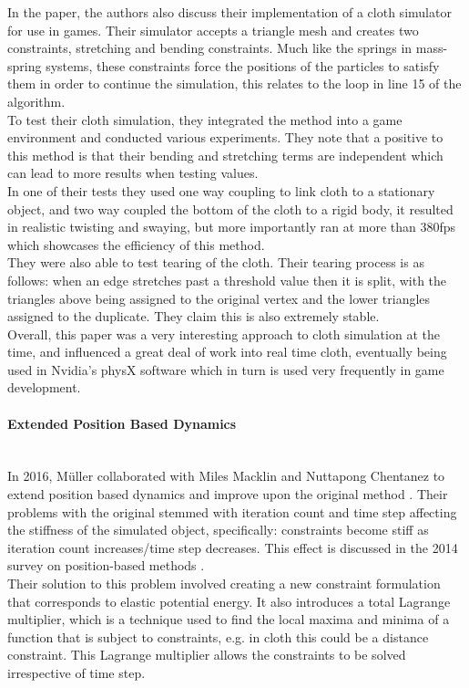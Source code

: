 \documentclass[12pt,a4paper]{article}
\begin{document}
In the paper, the authors also discuss their implementation of a cloth simulator for use in games. Their simulator accepts a triangle mesh and creates two constraints, stretching and bending constraints. Much like the springs in mass-spring systems, these constraints force the positions of the particles to satisfy them in order to continue the simulation, this relates to the loop in line 15 of the algorithm.
\\
To test their cloth simulation, they integrated the method into a game environment and conducted various experiments. They note that a positive to this method is that their bending and stretching terms are independent which can lead to more results when testing values. \\ 
In one of their tests they used one way coupling to link cloth to a stationary object, and two way coupled the bottom of the cloth to a rigid body, it resulted in realistic twisting and swaying, but more importantly ran at more than 380fps which showcases the efficiency of this method. \\
They were also able to test tearing of the cloth. Their tearing process is as follows: when an edge stretches past a threshold value then it is split, with the triangles above being assigned to the original vertex and the lower triangles assigned to the duplicate. They claim this is also extremely stable.\\

Overall, this paper was a very interesting approach to cloth simulation at the time, and influenced a great deal of work into real time cloth, eventually being used in Nvidia's physX software which in turn is used very frequently in game development.

\paragraph{Extended Position Based Dynamics} \mbox{} \\
In 2016, Müller collaborated with Miles Macklin and Nuttapong Chentanez to extend position based dynamics and improve upon the original method \cite{macklin2016xpbd}. Their problems with the original stemmed with iteration count and time step affecting the stiffness of the simulated object, specifically: constraints become stiff as iteration count increases/time step decreases. This effect is discussed in the 2014 survey on position-based methods \cite{bender2014survey}. \\
Their solution to this problem involved creating a new constraint formulation that corresponds to elastic potential energy. It also introduces a total Lagrange multiplier, which is a technique used to find the local maxima and minima of a function that is subject to constraints, e.g. in cloth this could be a distance constraint. This Lagrange multiplier allows the constraints to be solved irrespective of time step.\\
\end{document}
